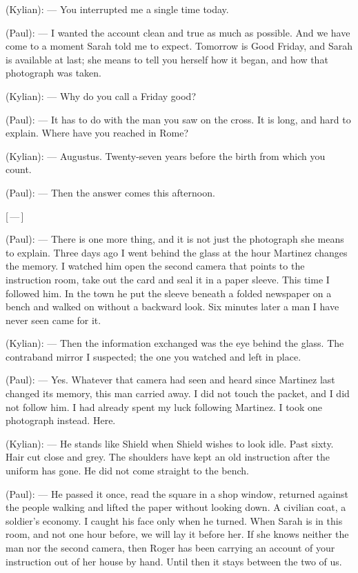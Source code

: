 \begin{room}

(Kylian): --- You interrupted me a single time today.

(Paul): --- I wanted the account clean and true as much as possible. And we have come to a moment Sarah told me to expect. Tomorrow is Good Friday, and Sarah is available at last; she means to tell you herself how it began, and how that photograph was taken.

(Kylian): --- Why do you call a Friday good?

(Paul): --- It has to do with the man you saw on the cross. It is long, and hard to explain. Where have you reached in Rome?

(Kylian): --- Augustus. Twenty-seven years before the birth from which you count.

(Paul): --- Then the answer comes this afternoon.

\centerline{[\,---\,]}

(Paul): --- There is one more thing, and it is not just the photograph she means to explain. Three days ago I went behind the glass at the hour Martinez changes the memory. I watched him open the second camera that points to the instruction room, take out the card and seal it in a paper sleeve. This time I followed him. In the town he put the sleeve beneath a folded newspaper on a bench and walked on without a backward look. Six minutes later a man I have never seen came for it.

(Kylian): --- Then the information exchanged was the eye behind the glass. The contraband mirror I suspected; the one you watched and left in place.

(Paul): --- Yes. Whatever that camera had seen and heard since Martinez last changed its memory, this man carried away. I did not touch the packet, and I did not follow him. I had already spent my luck following Martinez. I took one photograph instead. Here.

(Kylian): --- He stands like Shield when Shield wishes to look idle. Past sixty. Hair cut close and grey. The shoulders have kept an old instruction after the uniform has gone. He did not come straight to the bench.

(Paul): --- He passed it once, read the square in a shop window, returned against the people walking and lifted the paper without looking down. A civilian coat, a soldier's economy. I caught his face only when he turned. When Sarah is in this room, and not one hour before, we will lay it before her. If she knows neither the man nor the second camera, then Roger has been carrying an account of your instruction out of her house by hand. Until then it stays between the two of us.

\end{room}
